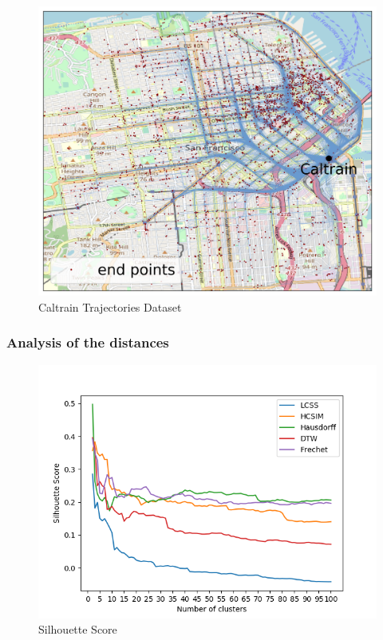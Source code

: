 \documentclass[a4paper, 12pt]{article}
\begin{document}
\begin{figure}[bp!]
    \centering
    \includegraphics[width=1\textwidth]{caltrain_trajectory_map.png}
    \caption{Caltrain Trajectories Dataset}
    \label{fig37}
\end{figure}

\subsubsection{Analysis of the distances}

\begin{figure}[ht]
    \centering
    \includegraphics[width=1\textwidth]{silhouette_caltrain_score.png}
    \caption{Silhouette Score}
    \label{fig38}
\end{figure}
\end{document}

